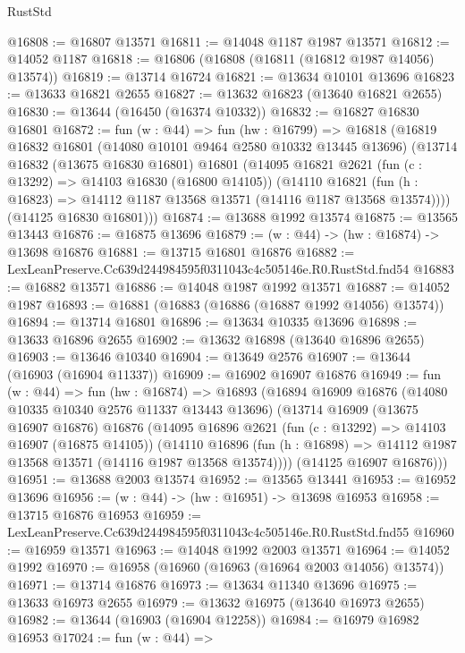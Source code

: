 \begin{lexlean}{RustStd}
\begin{coremodule}
@16808 := @16807 @13571
@16811 := @14048 @1187 @1987 @13571
@16812 := @14052 @1187
@16818 := @16806 (@16808 (@16811 (@16812 @1987 @14056) @13574))
@16819 := @13714 @16724
@16821 := @13634 @10101 @13696
@16823 := @13633 @16821 @2655
@16827 := @13632 @16823 (@13640 @16821 @2655)
@16830 := @13644 (@16450 (@16374 @10332))
@16832 := @16827 @16830 @16801
@16872 := fun (w : @44) =>
  fun (hw : @16799) =>
  @16818
    (@16819
      @16832
      @16801
      (@14080 @10101 @9464 @2580 @10332 @13445 @13696)
      (@13714
        @16832
        (@13675 @16830 @16801)
        @16801
        (@14095
          @16821
          @2621
          (fun (c : @13292) => @14103 @16830 (@16800 @14105))
          (@14110
            @16821
            (fun (h : @16823) => @14112 @1187 @13568 @13571 (@14116 @1187 @13568 @13574))))
        (@14125 @16830 @16801)))
@16874 := @13688 @1992 @13574
@16875 := @13565 @13443
@16876 := @16875 @13696
@16879 := (w : @44) -> (hw : @16874) -> @13698 @16876
@16881 := @13715 @16801 @16876
@16882 := LexLeanPreserve.Cc639d244984595f0311043c4c505146e.R0.RustStd.fnd54
@16883 := @16882 @13571
@16886 := @14048 @1987 @1992 @13571
@16887 := @14052 @1987
@16893 := @16881 (@16883 (@16886 (@16887 @1992 @14056) @13574))
@16894 := @13714 @16801
@16896 := @13634 @10335 @13696
@16898 := @13633 @16896 @2655
@16902 := @13632 @16898 (@13640 @16896 @2655)
@16903 := @13646 @10340
@16904 := @13649 @2576
@16907 := @13644 (@16903 (@16904 @11337))
@16909 := @16902 @16907 @16876
@16949 := fun (w : @44) =>
  fun (hw : @16874) =>
  @16893
    (@16894
      @16909
      @16876
      (@14080 @10335 @10340 @2576 @11337 @13443 @13696)
      (@13714
        @16909
        (@13675 @16907 @16876)
        @16876
        (@14095
          @16896
          @2621
          (fun (c : @13292) => @14103 @16907 (@16875 @14105))
          (@14110
            @16896
            (fun (h : @16898) => @14112 @1987 @13568 @13571 (@14116 @1987 @13568 @13574))))
        (@14125 @16907 @16876)))
@16951 := @13688 @2003 @13574
@16952 := @13565 @13441
@16953 := @16952 @13696
@16956 := (w : @44) -> (hw : @16951) -> @13698 @16953
@16958 := @13715 @16876 @16953
@16959 := LexLeanPreserve.Cc639d244984595f0311043c4c505146e.R0.RustStd.fnd55
@16960 := @16959 @13571
@16963 := @14048 @1992 @2003 @13571
@16964 := @14052 @1992
@16970 := @16958 (@16960 (@16963 (@16964 @2003 @14056) @13574))
@16971 := @13714 @16876
@16973 := @13634 @11340 @13696
@16975 := @13633 @16973 @2655
@16979 := @13632 @16975 (@13640 @16973 @2655)
@16982 := @13644 (@16903 (@16904 @12258))
@16984 := @16979 @16982 @16953
@17024 := fun (w : @44) =>

\end{coremodule}
\end{lexlean}
